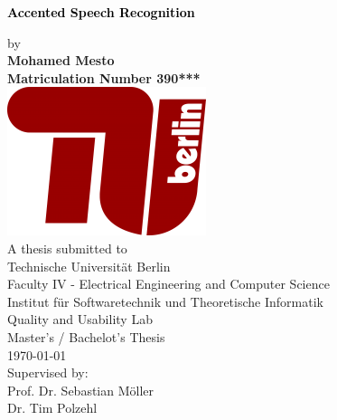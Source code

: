 \begin{titlepage}
	\strut
	\hfill
	\begin{center}
	\vspace{0.5cm}
		\Huge
		\begin{spacing}{.9}
			\textcolor{black}{\textbf{Accented Speech Recognition}}\\
		\end{spacing}
		\vspace{0.8cm}
		\large
		by\\
		\vspace{0.8cm}
		\textbf{Mohamed Mesto}\\
		\vspace{0.8cm}
		\textbf{Matriculation Number 390***}\\
			\vspace{0.8cm}
		\includegraphics[width=0.2 \textwidth]{images/TUBerlin.png}\\
	 	A thesis submitted to\\
		\vspace{0.8cm}
		Technische Universität Berlin\\
		Faculty IV - Electrical Engineering and Computer Science\\
		Institut für Softwaretechnik und Theoretische Informatik\\
		Quality and Usability Lab\\
		\vspace{0.5cm}
		Master's / Bachelot's Thesis\\
		\vspace{1cm}
		\today\\
		\large
		Supervised by:\\
		Prof. Dr. Sebastian Möller \\
		Dr. Tim Polzehl \\
		\end{center}

\end{titlepage}



